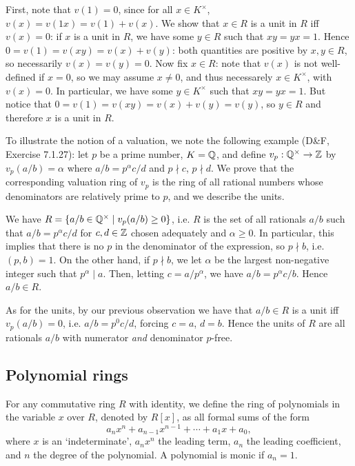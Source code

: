 First, note that $v(1)=0$, since for all $x\in K^\times$, $v(x)=v(1x)=v(1)+v(x)$. We show that $x\in R$ is a unit in $R$ iff $v(x)=0$: if $x$ is a unit in $R$, we have some $y\in R$ such that $xy=yx=1$. Hence $0=v(1)=v(xy)=v(x)+v(y)$: both quantities are positive by $x,y\in R$, so necessarily $v(x)=v(y)=0$. Now fix $x\in R$: note that $v(x)$ is not well-defined if $x=0$, so we may assume $x\neq 0$, and thus necessarely $x\in K^\times$, with $v(x)=0$. In particular, we have some $y\in K^\times$ such that $xy=yx=1$. But notice that $0=v(1)=v(xy)=v(x)+v(y)=v(y)$, so $y\in R$ and therefore $x$ is a unit in $R$.

To illustrate the notion of a valuation, we note the following example (D\&F, Exercise 7.1.27): let $p$ be a prime number, $K=\mathbb{Q}$, and define $v_p:\mathbb{Q}^\times\to\mathbb{Z}$ by $v_p(a/b)=\alpha$ where $a/b=p^\alpha c/d$ and $p\nmid c$, $p\nmid d$. We prove that the corresponding valuation ring of $v_p$ is the ring of all rational numbers whose denominators are relatively prime to $p$, and we describe the units.

We have $R=\{a/b\in\mathbb{Q}^\times \mid v_p(a/b)\geq 0\}$, i.e. $R$ is the set of all rationals $a/b$ such that $a/b=p^\alpha c/d$ for $c,d\in\mathbb{Z}$ chosen adequately and $\alpha\geq 0$. In particular, this implies that there is no $p$ in the denominator of the expression, so $p\nmid b$, i.e. $(p,b)=1$. On the other hand, if $p\nmid b$, we let $\alpha$ be the largest non-negative integer such that $p^\alpha \mid a$. Then, letting $c=a/p^\alpha$, we have $a/b=p^\alpha c/b$. Hence $a/b\in R$.

As for the units, by our previous observation we have that $a/b\in R$ is a unit iff $v_p(a/b)=0$, i.e. $a/b=p^0 c/d$, forcing $c=a$, $d=b$. Hence the units of $R$ are all rationals $a/b$ with numerator \emph{and} denominator $p$-free.




\subsection{Polynomial rings}

For any commutative ring $R$ with identity, we define the ring of polynomials in the variable $x$ over $R$, denoted by $R[x]$, as all formal sums of the form
\[
	a_nx^n+a_{n-1}x^{n-1}+\cdots + a_1x + a_0,
\]
where $x$ is an `indeterminate', $a_nx^n$ the leading term, $a_n$ the leading coefficient, and $n$ the degree of the polynomial. A polynomial is monic if $a_n=1$.

